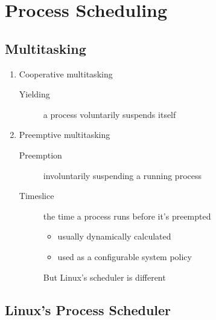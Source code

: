 \mode*
{}

\section{Process Scheduling}

\subsection{Multitasking}

\begin{frame}
  \begin{enumerate}
  \item Cooperative multitasking
    \begin{description}
    \item[Yielding] a process voluntarily suspends itself
    \end{description}
  \item Preemptive multitasking
    \begin{description}
    \item[Preemption] involuntarily suspending a running process
    \item[Timeslice] the time a process runs before it's preempted
      \begin{itemize}
      \item usually dynamically calculated
      \item used as a configurable system policy
      \end{itemize}
      But Linux's scheduler is different
    \end{description}
  \end{enumerate}
\end{frame}

\subsection{Linux's Process Scheduler}

